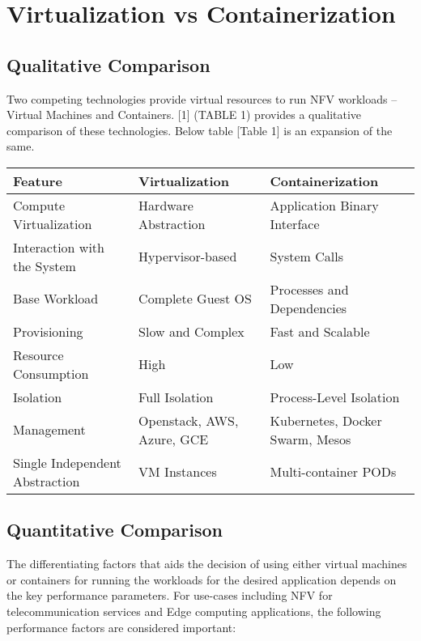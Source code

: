 \section{Virtualization vs Containerization}

\subsection{Qualitative Comparison}
	
\begin{flushleft}
Two competing technologies provide virtual resources to run NFV workloads – Virtual Machines and Containers. [1] (TABLE 1) provides a qualitative comparison of these technologies. Below table [Table 1] is an expansion of the same.

\begin{tabular}{ ||p{4cm}|p{4cm}|p{4cm}|| }
	
\hline
\textbf{Feature} & \textbf{Virtualization} & \textbf{Containerization} \\
\hline\hline
Compute Virtualization & Hardware Abstraction & Application Binary Interface \\
\hline
Interaction with the System & Hypervisor-based & System Calls \\
\hline
Base Workload & Complete Guest OS & Processes and Dependencies \\
\hline
Provisioning & Slow and Complex & Fast and Scalable \\
\hline
Resource Consumption & High & Low \\
\hline
Isolation & Full Isolation & Process-Level Isolation \\
\hline
Management & Openstack, AWS, Azure, GCE & Kubernetes, Docker Swarm, Mesos \\
\hline
Single Independent Abstraction & VM Instances & Multi-container PODs \\
\hline\hline
\end{tabular}
	
\end{flushleft}

\subsection{Quantitative Comparison}

\begin{flushleft}
The differentiating factors that aids the decision of using either virtual machines or containers for running the workloads for the desired application depends on the key performance parameters. For use-cases including NFV for telecommunication services and Edge computing applications, the following performance factors are considered important:
\end{flushleft}

